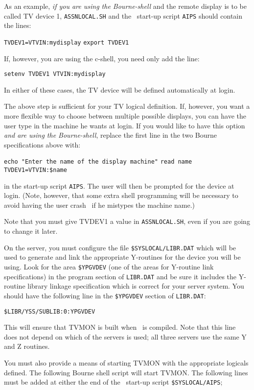 As an example, {\it if you are using the Bourne-shell} and the remote
display is to be called TV device 1, {\tt ASSNLOCAL.SH} and the
\AIPS\ start-up script {\tt AIPS} should contain the lines:

\noindent
{\tt TVDEV1=VTVIN:mydisplay}\hfill\break
{\tt export TVDEV1}

If, however, you are using the c-shell, you need only add the line:

\noindent
{\tt setenv TVDEV1 VTVIN:mydisplay}

\noindent
In either of these cases, the TV device will be defined automatically at
login.

The above step is sufficient for your TV logical definition.  If,
however, you want a more flexible way to choose between multiple possible
displays, you can have the user type in the machine he wants at login.
If you would like to have this option {\it and are using the Bourne-shell},
replace the first line in the two Bourne specifications above with:

\noindent
{\tt echo "Enter the name of the display machine"}\hfill\break
{\tt read name}\hfill\break
{\tt TVDEV1=VTVIN:\$name}

\noindent
in the start-up script \hbox{{\tt AIPS}}. The user will then be
prompted for the device at login. (Note, however, that some extra
shell programming will be necessary to avoid having the user crash
\AIPS\ if he mistypes the machine name.)

Note that you must give TVDEV1 a value in {\tt ASSNLOCAL.SH}, even if
you are going to change it later.


On the server, you must configure the file {\tt \$SYSLOCAL/LIBR.DAT} which
will be used to generate and link the appropriate Y-routines for the device
you will be using.  Look for the area {\tt \$YPGVDEV} (one of the areas for
Y-routine link specifications) in the program section of {\tt LIBR.DAT} and
be sure it includes the Y-routine library linkage specification which is
correct for your server system.  You should have the following line in
the {\tt \$YPGVDEV} section of \hbox{{\tt LIBR.DAT}}:

\noindent
{\tt \$LIBR/YSS/SUBLIB:0:YPGVDEV}

This will ensure that TVMON is built when \AIPS\ is compiled.  Note
that this line does not depend on which of the servers is used; all
three servers use the same Y and Z routines.

You must also provide a means of starting TVMON with the appropriate
logicals defined.  The following Bourne shell script will start
\hbox{TVMON}.  The following lines must be added at either the end of
the \AIPS\ start-up script {\tt \$SYSLOCAL/AIPS};

